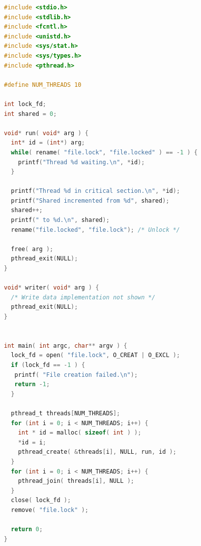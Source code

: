 \begin{lstlisting}[language=C]
#include <stdio.h>
#include <stdlib.h>
#include <fcntl.h>
#include <unistd.h>
#include <sys/stat.h>
#include <sys/types.h>
#include <pthread.h>

#define NUM_THREADS 10

int lock_fd;
int shared = 0;

void* run( void* arg ) {
  int* id = (int*) arg;
  while( rename( "file.lock", "file.locked" ) == -1 ) {
    printf("Thread %d waiting.\n", *id); 
  }

  printf("Thread %d in critical section.\n", *id);
  printf("Shared incremented from %d", shared);
  shared++;
  printf(" to %d.\n", shared);
  rename("file.locked", "file.lock"); /* Unlock */

  free( arg );
  pthread_exit(NULL);
}

void* writer( void* arg ) {
  /* Write data implementation not shown */
  pthread_exit(NULL);
}


int main( int argc, char** argv ) {
  lock_fd = open( "file.lock", O_CREAT | O_EXCL );  
  if (lock_fd == -1 ) {
   printf( "File creation failed.\n");
   return -1;
  }

  pthread_t threads[NUM_THREADS];
  for (int i = 0; i < NUM_THREADS; i++) {
    int * id = malloc( sizeof( int ) );
    *id = i;
    pthread_create( &threads[i], NULL, run, id );
  }
  for (int i = 0; i < NUM_THREADS; i++) {
    pthread_join( threads[i], NULL );
  }
  close( lock_fd );
  remove( "file.lock" );

  return 0;
}
\end{lstlisting}



